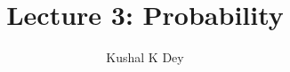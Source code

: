 \documentclass{beamer}\usepackage[]{graphicx}\usepackage[]{color}
\title{Lecture 3: Probability}
\author{Kushal K Dey}
\date{}
\begin{document}





\begin{frame}{}
\maketitle
\end{frame}

\end{document}
